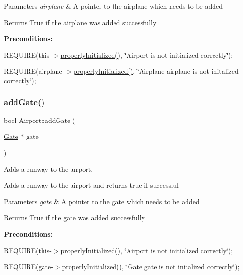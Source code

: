 \begin{DoxyParams}{Parameters}
{\em airplane} & A pointer to the airplane which needs to be added \\
\hline
\end{DoxyParams}
\begin{DoxyReturn}{Returns}
True if the airplane was added successfully
\end{DoxyReturn}
{\bfseries Preconditions\+:}
\begin{DoxyItemize}
\item R\+E\+Q\+U\+I\+RE(this-\/$>$\mbox{\hyperlink{class_airport_aa13e68ac58e8875837fbe888325cfff6}{properly\+Initialized()}}, \char`\"{}\+Airport is not initialized correctly\char`\"{});
\item R\+E\+Q\+U\+I\+RE(airplane-\/$>$\mbox{\hyperlink{class_airport_aa13e68ac58e8875837fbe888325cfff6}{properly\+Initialized()}}, \char`\"{}\+Airplane \textquotesingle{}airplane\textquotesingle{} is not initalized correctly\char`\"{}); 
\end{DoxyItemize}\mbox{\label{class_airport_a261e0c60f7e788de20ea902cb09b4569}} 
\subsubsection{\texorpdfstring{add\+Gate()}{addGate()}}
{\footnotesize\ttfamily bool Airport\+::add\+Gate (\begin{DoxyParamCaption}\item[{\mbox{\hyperlink{class_gate}{Gate}} $\ast$}]{gate }\end{DoxyParamCaption})}



Adds a runway to the airport. 

Adds a runway to the airport and returns true if successful


\begin{DoxyParams}{Parameters}
{\em gate} & A pointer to the gate which needs to be added \\
\hline
\end{DoxyParams}
\begin{DoxyReturn}{Returns}
True if the gate was added successfully
\end{DoxyReturn}
{\bfseries Preconditions\+:}
\begin{DoxyItemize}
\item R\+E\+Q\+U\+I\+RE(this-\/$>$\mbox{\hyperlink{class_airport_aa13e68ac58e8875837fbe888325cfff6}{properly\+Initialized()}}, \char`\"{}\+Airport is not initialized correctly\char`\"{});
\item R\+E\+Q\+U\+I\+RE(gate-\/$>$\mbox{\hyperlink{class_airport_aa13e68ac58e8875837fbe888325cfff6}{properly\+Initialized()}}, \char`\"{}\+Gate \textquotesingle{}gate\textquotesingle{} is not initalized correctly\char`\"{}); 
\end{DoxyItemize}\mbox{\label{class_airport_a8e8c8a80b3726c1dda7408e90469b9e7}} 
